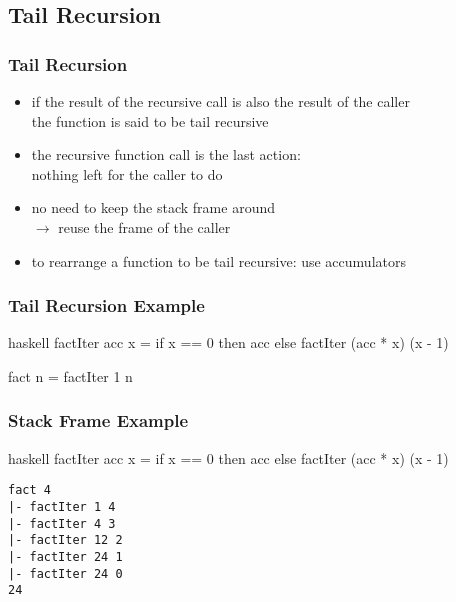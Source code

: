 \documentclass[dvipsnames]{beamer}
\theoremstyle{plain}
\begin{document}
\subsection{Tail Recursion}

\begin{frame}
  \frametitle{Tail Recursion}

  \begin{itemize}
    \item if the result of the recursive call is also the result of the caller\\
      the function is said to be \alert{tail recursive}
    \item the recursive function call is the last action:\\
      nothing left for the caller to do

    \pause
    \medskip
    \item no need to keep the stack frame around\\
      $\rightarrow$ reuse the frame of the caller

    \pause
    \medskip
    \item to rearrange a function to be tail recursive: use accumulators
  \end{itemize}
\end{frame}

\begin{frame}[fragile]
  \frametitle{Tail Recursion Example}

  \begin{example}[factorial]
    \begin{pygments}{haskell}
factIter acc x =
    if x == 0
    then acc
    else factIter (acc * x) (x - 1)

fact n = factIter 1 n
    \end{pygments}
  \end{example}
\end{frame}

\begin{frame}[fragile]
  \frametitle{Stack Frame Example}

  \begin{example}
    \begin{pygments}{haskell}
factIter acc x =
    if x == 0 then acc
    else factIter (acc * x) (x - 1)
    \end{pygments}

    \pause
    \begin{verbatim}
fact 4
|- factIter 1 4
|- factIter 4 3
|- factIter 12 2
|- factIter 24 1
|- factIter 24 0
24
    \end{verbatim}
  \end{example}
\end{frame}
\end{document}
